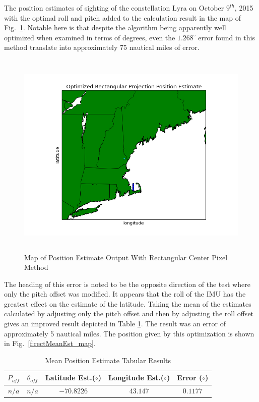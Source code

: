 \documentclass[12pt,a4paper]{book}
\begin{document}
The position estimates of sighting of the constellation Lyra on October $9^{th}$, 2015 with the optimal roll and pitch added to the calculation result in the map of Fig.~\ref{f:optimalRectangular}.  Notable here is that despite the algorithm being apparently well optimized when examined in terms of degrees, even the $1.268^{\circ}$ error found in this method translate into approximately 75 nautical miles of error.

\begin{figure}[!ht]
\centering
\includegraphics[height=10cm]{optimalRectangular.png}
\caption{Map of Position Estimate Output With Rectangular Center Pixel Method}\label{f:optimalRectangular}
\end{figure}
\FloatBarrier
The heading of this error is noted to be the opposite direction of the test where only the pitch offset was modified.  It appears that the roll of the IMU has the greatest effect on the estimate of the latitude.  Taking the mean of the estimates calculated by adjusting only the pitch offset and then by adjusting the roll offset gives an improved result depicted in Table \ref{t:rectMeanEstimate}.  The result was an error of approximately 5 nautical miles.    The position given by this optimization is shown in Fig.~\ref{f:rectMeanEst_map}.  
\begin{table}[ht!]
\centering
\begin{tabular}{ |c|c|c|c|c| } 
 \hline
 $P_{off}$ & $\theta_{off}$ & Latitude Est.($\circ$) & Longitude Est.($\circ$)&Error ($\circ$) \\ 
 \hline
 $n/a$ & $n/a$ & $-70.8226$ & $43.147$ &$0.1177$   \\ 
 \hline
\end{tabular}
\caption{Mean Position Estimate Tabular Results}
\label{t:rectMeanEstimate}
\end{table}
\end{document}
